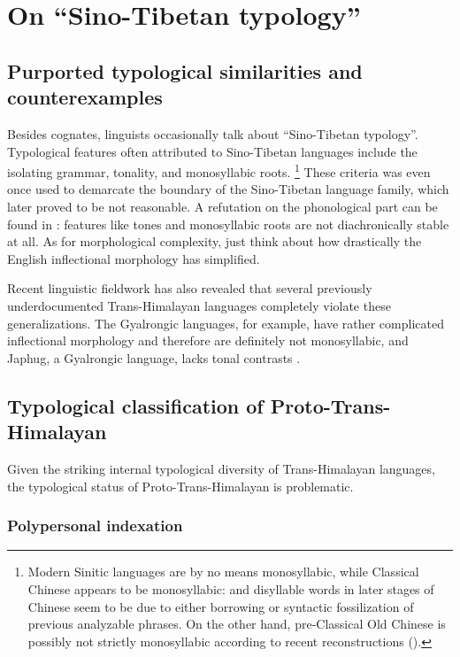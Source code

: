 \documentclass[UTF8, a4paper, oneside, scheme=plain, 12pt]{ctexrep}
\begin{document}
\section{On ``Sino-Tibetan typology''}\label{sec:intro.sino-tibetan-typology}

\subsection{Purported typological similarities and counterexamples}
Besides cognates, linguists occasionally talk about ``Sino-Tibetan typology''.
Typological features often attributed to Sino-Tibetan languages include the isolating grammar,
tonality, and monosyllabic roots.%
\footnote{
    Modern Sinitic languages are by no means monosyllabic,
    while Classical Chinese appears to be monosyllabic:
    and disyllable words in later stages of Chinese seem to be due to 
    either borrowing or syntactic fossilization of previous analyzable phrases.
    On the other hand, pre-Classical Old Chinese is possibly not strictly monosyllabic
    according to recent reconstructions ().
}
These criteria was even once used to demarcate the boundary of the Sino-Tibetan language family,
which later proved to be not reasonable.
A refutation on the phonological part can be found in \citet{matisoff1973notes}:
features like tones and monosyllabic roots are not diachronically stable at all. 
As for morphological complexity, just think about how drastically the English inflectional morphology has simplified.

Recent linguistic fieldwork has also revealed that several previously underdocumented Trans-Himalayan languages
completely violate these generalizations.
The Gyalrongic languages, for example, have rather complicated inflectional morphology
and therefore are definitely not monosyllabic,
and Japhug, a Gyalrongic language, lacks tonal contrasts \citep{jacques2021grammar}.

\subsection{Typological classification of Proto-Trans-Himalayan}

Given the striking internal typological diversity of Trans-Himalayan languages,
the typological status of Proto-Trans-Himalayan is problematic.

\subsubsection{Polypersonal indexation}
\end{document}
